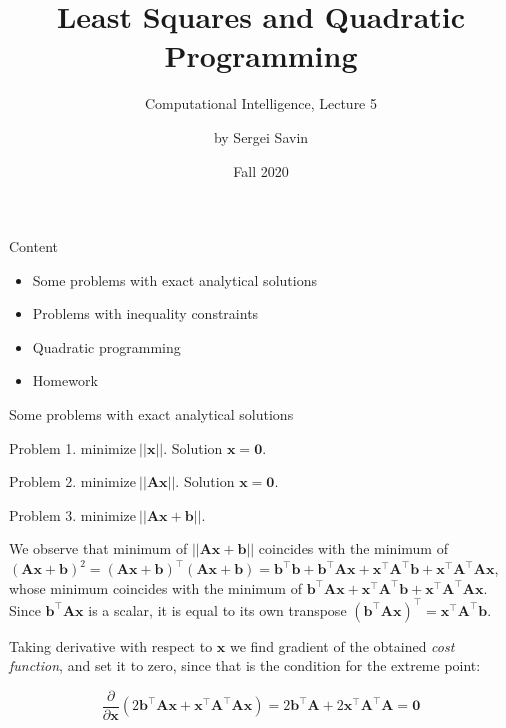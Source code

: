 \documentclass{beamer}
\title{Least Squares and Quadratic Programming}
\subtitle{Computational Intelligence, Lecture 5}
\author{by Sergei Savin}
\date{Fall 2020}
\begin{document}
\maketitle


\begin{frame}{Content}

\begin{itemize}
\item Some problems with exact analytical solutions
\item Problems with inequality constraints
\item Quadratic programming
\item Homework
\end{itemize}

\end{frame}



\begin{frame}{Some problems with exact analytical solutions}
\begin{flushleft}

Problem 1. $\text{minimize} \ ||\mathbf{x}||$. Solution $\mathbf{x} = \mathbf{0}$.

\bigskip

Problem 2. $\text{minimize} \ ||\mathbf{A}\mathbf{x}||$. Solution $\mathbf{x} = \mathbf{0}$.

\bigskip

Problem 3. $\text{minimize} \ ||\mathbf{A}\mathbf{x} + \mathbf{b}||$. 

\bigskip

We observe that minimum of $||\mathbf{A}\mathbf{x} + \mathbf{b}||$ coincides with the minimum of $(\mathbf{A}\mathbf{x} + \mathbf{b})^2 = (\mathbf{A}\mathbf{x} + \mathbf{b})^\top (\mathbf{A}\mathbf{x} + \mathbf{b}) = \mathbf{b}^\top\mathbf{b} + \mathbf{b}^\top\mathbf{A}\mathbf{x} + \mathbf{x}^\top\mathbf{A}^\top\mathbf{b} + \mathbf{x}^\top\mathbf{A}^\top\mathbf{A}\mathbf{x}$, whose minimum coincides with the minimum of $\mathbf{b}^\top\mathbf{A}\mathbf{x} + \mathbf{x}^\top\mathbf{A}^\top\mathbf{b} + \mathbf{x}^\top\mathbf{A}^\top\mathbf{A}\mathbf{x}$. Since $\mathbf{b}^\top\mathbf{A}\mathbf{x}$ is a scalar, it is equal to its own transpose $(\mathbf{b}^\top\mathbf{A}\mathbf{x})^\top = \mathbf{x}^\top\mathbf{A}^\top\mathbf{b}$.

Taking derivative with respect to $\mathbf{x}$ we find gradient of the obtained \emph{cost function}, and set it to zero, since that is the condition for the extreme point:

\begin{equation}
    \frac{\partial}{\partial \mathbf{x}} (2\mathbf{b}^\top\mathbf{A}\mathbf{x} + \mathbf{x}^\top\mathbf{A}^\top\mathbf{A}\mathbf{x}) = 2\mathbf{b}^\top\mathbf{A} + 2\mathbf{x}^\top\mathbf{A}^\top\mathbf{A} = \mathbf{0}
\end{equation}
 
\end{flushleft}
\end{frame}
\end{document}
